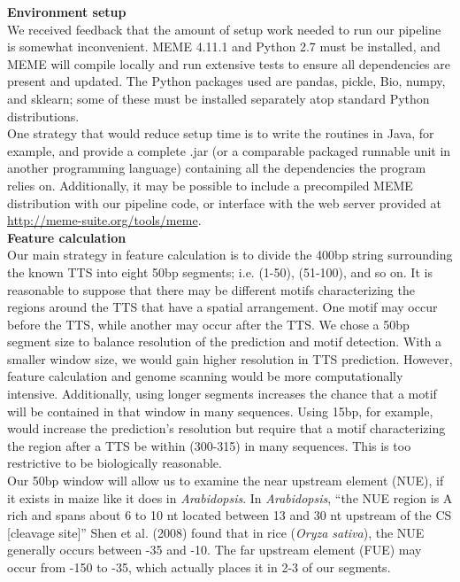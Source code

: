 \documentclass[12pt,letterpaper]{report}
\begin{document}
{\Large\textbf{Environment setup}}\\

We received feedback that the amount of setup work needed to run our pipeline is somewhat inconvenient. MEME 4.11.1 and Python 2.7 must be installed, and MEME will compile locally and run extensive tests to ensure all dependencies are present and updated. The Python packages used are pandas, pickle, Bio, numpy, and sklearn; some of these must be installed separately atop standard Python distributions. \\

\indent One strategy that would reduce setup time is to write the routines in Java, for example, and provide a complete .jar (or a comparable packaged runnable unit in another programming language) containing all the dependencies the program relies on. Additionally, it may be possible to include a precompiled MEME distribution with our pipeline code, or interface with the web server provided at \url{http://meme-suite.org/tools/meme}.\\

{\Large\textbf{Feature calculation}}\\

Our main strategy in feature calculation is to divide the 400bp string surrounding the known TTS into eight 50bp segments; i.e. (1-50), (51-100), and so on. It is reasonable to suppose that there may be different motifs characterizing the regions around the TTS that have a spatial arrangement. One motif may occur before the TTS, while another may occur after the TTS. We chose a 50bp segment size to balance resolution of the prediction and motif detection. With a smaller window size, we would gain higher resolution in TTS prediction. However, feature calculation and genome scanning would be more computationally intensive. Additionally, using longer segments increases the chance that a motif will be contained in that window in many sequences. Using 15bp, for example, would increase the prediction's resolution but require that a motif characterizing the region after a TTS be within (300-315) in many sequences. This is too restrictive to be biologically reasonable.\\

\indent Our 50bp window will allow us to examine the near upstream element (NUE), if it exists in maize like it does in \textsl{Arabidopsis}. In \textsl{Arabidopsis},  ``the NUE region is A rich and spans about 6 to 10 nt located between 13 and 30 nt upstream of the CS [cleavage site]'' \cite{loke05} Shen et al. (2008) found that in rice (\textsl{Oryza sativa}), the NUE generally occurs between -35 and -10. The far upstream element (FUE) may occur from -150 to -35, which actually places it in 2-3 of our segments.\\
\end{document}
